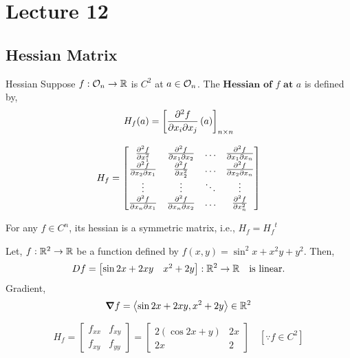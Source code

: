 \documentclass[../Analysis-3.tex]{subfiles}
\begin{document}
\chapter*{Lecture 12} %
\setcounter{chapter}{12} %
\setcounter{section}{0}

\section{Hessian Matrix}

\begin{Def}{Hessian}{}
  Suppose $f : \mathcal{O}_{n} \to \mathbb{R}$ is $C^2$ at $a \in \mathcal{O}_{n} $. The $\textbf{Hessian of $f$ at $a$}$ is defined by, \[ H_f(a) = \left[ \pdv{f}{x_i}{x_j}\left( a \right) \right]_{n \times n} \]
\end{Def}

\[ H_{f} = \begin{bmatrix}
    \pdv[2]{f}{x_1}   & \pdv{f}{x_1}{x_2} & \ldots & \pdv{f}{x_1}{x_n} \\
    \pdv{f}{x_2}{x_1} & \pdv[2]{f}{x_2}   & \ldots & \pdv{f}{x_2}{x_n} \\
    \vdots            & \vdots            & \ddots & \vdots            \\
    \pdv{f}{x_n}{x_1} & \pdv{f}{x_n}{x_2} & \ldots & \pdv[2]{f}{x_n}
  \end{bmatrix} \]

\begin{noteBox}
  For any $ f \in C^n $, its hessian is a symmetric matrix, i.e., $H_f = {H_f}^t$
\end{noteBox}

\begin{Eg}{}{}
  Let, $f : \mathbb{R}^2 \to \mathbb{R}$ be a function defined by $f(x,y) = \sin^2 x + x^2y + y^2$. Then,
  \[Df = \begin{bmatrix}
      \sin2x + 2xy & x^2 + 2y
    \end{bmatrix} :  \mathbb{R}^2 \to \mathbb{R} \quad \text{is linear.} \]
  Gradient, \[\grad f = \left\langle \sin2x + 2xy, x^2 + 2y \right\rangle \in \mathbb{R}^2 \]

  \[ H_f = \begin{bmatrix}
      f_{xx} & f_{xy} \\
      f_{xy} & f_{yy}
    \end{bmatrix} = \begin{bmatrix}
      2( \cos2x + y) & 2x \\
      2x             & 2
    \end{bmatrix} \quad [ \because  f \in C^2] \]

\end{Eg}
\end{document}
